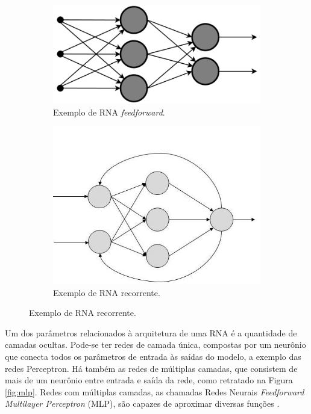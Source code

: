 \begin{figure}
	\caption{Exemplos de RNA com diferentes tipos de conexões entre neurônios.}
	\label{fig:rna_conectividade}
	\begin{subfigure}[h]{0.3\linewidth}
		\caption{Exemplo de RNA \emph{feedforward}.}
		\label{fig:feedforward}
		\includegraphics[width=\linewidth]{img/feedforward}
	\end{subfigure}
	\hfill
	\begin{subfigure}[h]{0.4\linewidth}
		\caption{Exemplo de RNA recorrente.}
		\label{fig:recorrente}
		\includegraphics[width=\linewidth]{img/recorrente}
	\end{subfigure}%
\end{figure}

Um dos parâmetros relacionados à arquitetura de uma RNA é a quantidade de camadas ocultas. Pode-se ter redes de camada única, compostas por um neurônio que conecta todos os parâmetros de entrada às saídas do modelo, a exemplo das redes Perceptron. Há também as redes de múltiplas camadas, que consistem de mais de um neurônio entre entrada e saída da rede, como retratado na Figura \ref{fig:mlp}. Redes com múltiplas camadas, as chamadas Redes Neurais \emph{Feedforward Multilayer Perceptron} (MLP), são capazes de aproximar diversas funções \cite{hornik1991approximation,Teresa:Livro}.

